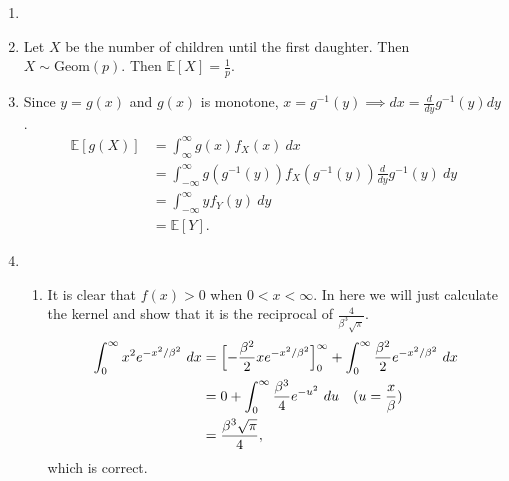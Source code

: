 \documentclass{article}
\begin{document}
\begin{enumerate}
    \item 

    \item Let $X$ be the number of children until the first daughter. Then $X \sim \text{Geom}(p)$. Then 
    $\mathbb{E}[X] = \frac{1}{p}$.

    \item Since $y = g(x)$ and $g(x)$ is monotone, $x = g^{-1}(y) \implies dx = \frac{d}{dy}g^{-1}(y) dy$. 
    \begin{align*}
        \mathbb{E}[g(X)]
        &= \int_{\infty}^{\infty} g(x)f_{X}(x) \ dx \\
        &= \int_{-\infty}^{\infty} g(g^{-1}(y)) f_{X}(g^{-1}(y)) \frac{d}{dy}g^{-1}(y) \ dy \\
        &= \int_{-\infty}^{\infty} yf_{Y}(y) \ dy \\
        &= \mathbb{E}[Y].
    \end{align*}

    \item \begin{enumerate}
        \item It is clear that $f(x) > 0$ when $0 < x < \infty$. In here we will just calculate the kernel 
        and show that it is the reciprocal of $\frac{4}{\beta^{3} \sqrt{\pi}}$.
        \begin{align*}
            \int_{0}^{\infty} x^{2} e^{-x^2 / \beta^2} \ dx 
            &= \Bigl[ -\frac{\beta^2}{2}xe^{-x^2 / \beta^2} \Bigr]_{0}^{\infty}
            + \int_{0}^{\infty} \frac{\beta^{2}}{2} e^{-x^2 / \beta^2} \ dx \\
            &= 0 + \int_{0}^{\infty} \frac{\beta^3}{4} e^{-u^2} \ du \quad (u = \frac{x}{\beta}) \\
            &= \frac{\beta^3 \sqrt{\pi}}{4},
        \end{align*}
        which is correct.


\end{enumerate}
\end{enumerate}
\end{document}
